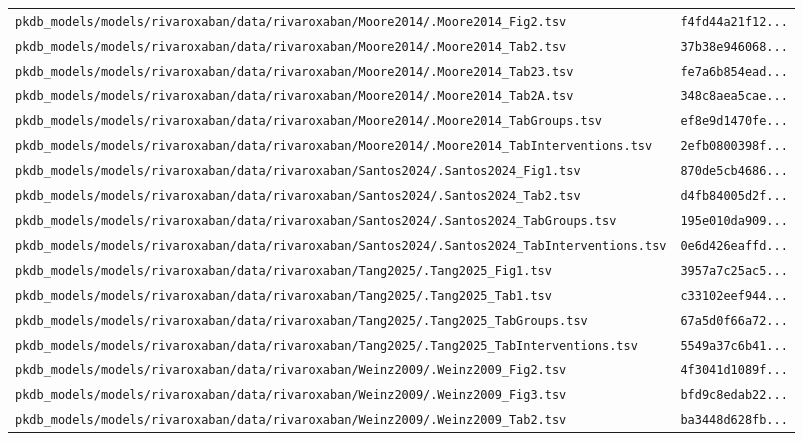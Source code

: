 \documentclass{article}
\begin{document}
\begin{longtable}{ll}
\texttt{pkdb\_models/models/rivaroxaban/data/rivaroxaban/Moore2014/.Moore2014\_Fig2.tsv} & \texttt{f4fd44a21f12...} \\
\texttt{pkdb\_models/models/rivaroxaban/data/rivaroxaban/Moore2014/.Moore2014\_Tab2.tsv} & \texttt{37b38e946068...} \\
\texttt{pkdb\_models/models/rivaroxaban/data/rivaroxaban/Moore2014/.Moore2014\_Tab23.tsv} & \texttt{fe7a6b854ead...} \\
\texttt{pkdb\_models/models/rivaroxaban/data/rivaroxaban/Moore2014/.Moore2014\_Tab2A.tsv} & \texttt{348c8aea5cae...} \\
\texttt{pkdb\_models/models/rivaroxaban/data/rivaroxaban/Moore2014/.Moore2014\_TabGroups.tsv} & \texttt{ef8e9d1470fe...} \\
\texttt{pkdb\_models/models/rivaroxaban/data/rivaroxaban/Moore2014/.Moore2014\_TabInterventions.tsv} & \texttt{2efb0800398f...} \\
\texttt{pkdb\_models/models/rivaroxaban/data/rivaroxaban/Santos2024/.Santos2024\_Fig1.tsv} & \texttt{870de5cb4686...} \\
\texttt{pkdb\_models/models/rivaroxaban/data/rivaroxaban/Santos2024/.Santos2024\_Tab2.tsv} & \texttt{d4fb84005d2f...} \\
\texttt{pkdb\_models/models/rivaroxaban/data/rivaroxaban/Santos2024/.Santos2024\_TabGroups.tsv} & \texttt{195e010da909...} \\
\texttt{pkdb\_models/models/rivaroxaban/data/rivaroxaban/Santos2024/.Santos2024\_TabInterventions.tsv} & \texttt{0e6d426eaffd...} \\
\texttt{pkdb\_models/models/rivaroxaban/data/rivaroxaban/Tang2025/.Tang2025\_Fig1.tsv} & \texttt{3957a7c25ac5...} \\
\texttt{pkdb\_models/models/rivaroxaban/data/rivaroxaban/Tang2025/.Tang2025\_Tab1.tsv} & \texttt{c33102eef944...} \\
\texttt{pkdb\_models/models/rivaroxaban/data/rivaroxaban/Tang2025/.Tang2025\_TabGroups.tsv} & \texttt{67a5d0f66a72...} \\
\texttt{pkdb\_models/models/rivaroxaban/data/rivaroxaban/Tang2025/.Tang2025\_TabInterventions.tsv} & \texttt{5549a37c6b41...} \\
\texttt{pkdb\_models/models/rivaroxaban/data/rivaroxaban/Weinz2009/.Weinz2009\_Fig2.tsv} & \texttt{4f3041d1089f...} \\
\texttt{pkdb\_models/models/rivaroxaban/data/rivaroxaban/Weinz2009/.Weinz2009\_Fig3.tsv} & \texttt{bfd9c8edab22...} \\
\texttt{pkdb\_models/models/rivaroxaban/data/rivaroxaban/Weinz2009/.Weinz2009\_Tab2.tsv} & \texttt{ba3448d628fb...} \\

\end{longtable}
\end{document}
